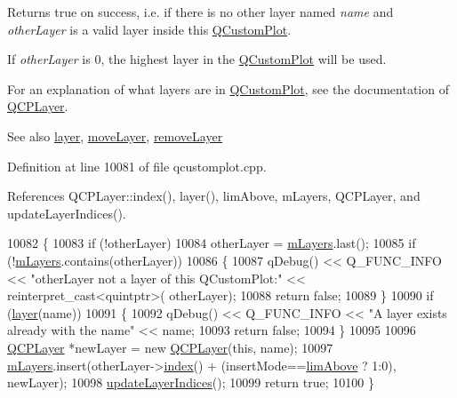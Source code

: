 Returns true on success, i.\+e. if there is no other layer named {\itshape name} and {\itshape other\+Layer} is a valid layer inside this \hyperlink{class_q_custom_plot}{Q\+Custom\+Plot}.

If {\itshape other\+Layer} is 0, the highest layer in the \hyperlink{class_q_custom_plot}{Q\+Custom\+Plot} will be used.

For an explanation of what layers are in \hyperlink{class_q_custom_plot}{Q\+Custom\+Plot}, see the documentation of \hyperlink{class_q_c_p_layer}{Q\+C\+P\+Layer}.

\begin{DoxySeeAlso}{See also}
\hyperlink{class_q_custom_plot_aac492da01782820454e9136a8db28182}{layer}, \hyperlink{class_q_custom_plot_ae896140beff19424e9e9e02d6e331104}{move\+Layer}, \hyperlink{class_q_custom_plot_a40f75e342c5eaab6a86066a42a0e2a94}{remove\+Layer} 
\end{DoxySeeAlso}


Definition at line 10081 of file qcustomplot.\+cpp.



References Q\+C\+P\+Layer\+::index(), layer(), lim\+Above, m\+Layers, Q\+C\+P\+Layer, and update\+Layer\+Indices().


\begin{DoxyCode}
10082 \{
10083   \textcolor{keywordflow}{if} (!otherLayer)
10084     otherLayer = \hyperlink{class_q_custom_plot_a72ee313041b873d76c198793ce7e6c37}{mLayers}.last();
10085   \textcolor{keywordflow}{if} (!\hyperlink{class_q_custom_plot_a72ee313041b873d76c198793ce7e6c37}{mLayers}.contains(otherLayer))
10086   \{
10087     qDebug() << Q\_FUNC\_INFO << \textcolor{stringliteral}{"otherLayer not a layer of this QCustomPlot:"} << \textcolor{keyword}{reinterpret\_cast<}quintptr\textcolor{keyword}{>}(
      otherLayer);
10088     \textcolor{keywordflow}{return} \textcolor{keyword}{false};
10089   \}
10090   \textcolor{keywordflow}{if} (\hyperlink{class_q_custom_plot_aac492da01782820454e9136a8db28182}{layer}(name))
10091   \{
10092     qDebug() << Q\_FUNC\_INFO << \textcolor{stringliteral}{"A layer exists already with the name"} << name;
10093     \textcolor{keywordflow}{return} \textcolor{keyword}{false};
10094   \}
10095     
10096   \hyperlink{class_q_c_p_layer}{QCPLayer} *newLayer = \textcolor{keyword}{new} \hyperlink{class_q_custom_plot_a5dbf96bf7664c1b6fce49063eeea6eef}{QCPLayer}(\textcolor{keyword}{this}, name);
10097   \hyperlink{class_q_custom_plot_a72ee313041b873d76c198793ce7e6c37}{mLayers}.insert(otherLayer->\hyperlink{class_q_c_p_layer_ad5d7010829a6b99f326b07d7e37c8c99}{index}() + (insertMode==\hyperlink{class_q_custom_plot_a75a8afbe6ef333b1f3d47abb25b9add7a062b0b7825650b432a713c0df6742d41}{limAbove} ? 1:0), newLayer);
10098   \hyperlink{class_q_custom_plot_a3117754df3a5638787a6223c7147970f}{updateLayerIndices}();
10099   \textcolor{keywordflow}{return} \textcolor{keyword}{true};
10100 \}
\end{DoxyCode}


